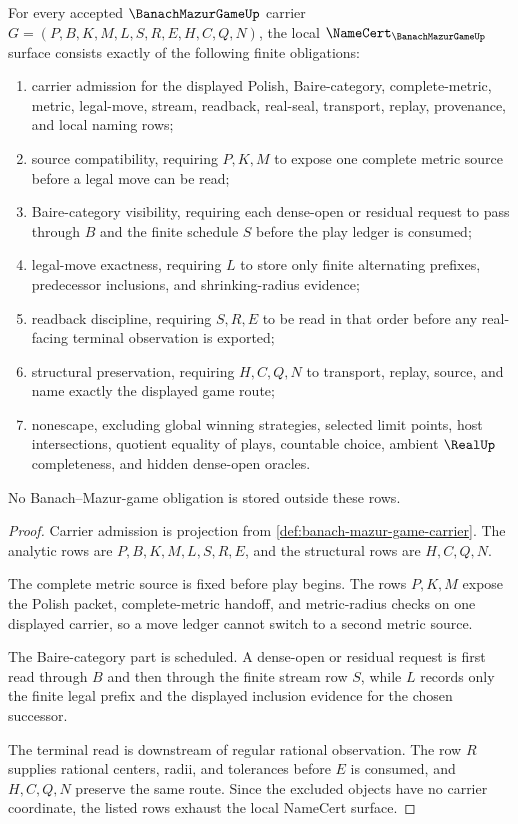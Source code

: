\begin{theorem}
\label{thm:banach-mazur-game-namecert-obligations}
For every accepted $\BanachMazurGameUp$ carrier $G=(P,B,K,M,L,S,R,E,H,C,Q,N)$, the local $\NameCert_{\BanachMazurGameUp}$ surface consists exactly of the following finite obligations:
\begin{enumerate}
\item carrier admission for the displayed Polish, Baire-category, complete-metric, metric, legal-move, stream, readback, real-seal, transport, replay, provenance, and local naming rows;
\item source compatibility, requiring $P,K,M$ to expose one complete metric source before a legal move can be read;
\item Baire-category visibility, requiring each dense-open or residual request to pass through $B$ and the finite schedule $S$ before the play ledger is consumed;
\item legal-move exactness, requiring $L$ to store only finite alternating prefixes, predecessor inclusions, and shrinking-radius evidence;
\item readback discipline, requiring $S,R,E$ to be read in that order before any real-facing terminal observation is exported;
\item structural preservation, requiring $H,C,Q,N$ to transport, replay, source, and name exactly the displayed game route;
\item nonescape, excluding global winning strategies, selected limit points, host intersections, quotient equality of plays, countable choice, ambient $\RealUp$ completeness, and hidden dense-open oracles.
\end{enumerate}
No Banach--Mazur-game obligation is stored outside these rows.
\end{theorem}
\begin{proof}
Carrier admission is projection from \autoref{def:banach-mazur-game-carrier}. The analytic rows are $P,B,K,M,L,S,R,E$, and the structural rows are $H,C,Q,N$.

The complete metric source is fixed before play begins. The rows $P,K,M$ expose the Polish packet, complete-metric handoff, and metric-radius checks on one displayed carrier, so a move ledger cannot switch to a second metric source.

The Baire-category part is scheduled. A dense-open or residual request is first read through $B$ and then through the finite stream row $S$, while $L$ records only the finite legal prefix and the displayed inclusion evidence for the chosen successor.

The terminal read is downstream of regular rational observation. The row $R$ supplies rational centers, radii, and tolerances before $E$ is consumed, and $H,C,Q,N$ preserve the same route. Since the excluded objects have no carrier coordinate, the listed rows exhaust the local NameCert surface.
\end{proof}

